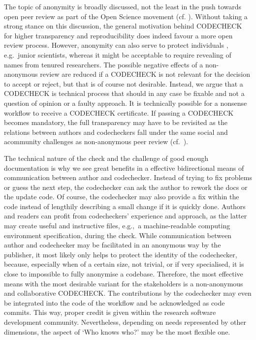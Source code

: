 \documentclass[12pt]{article}
\begin{document}
The topic of anonymity is broadly discussed, not the least in the push towards
open peer review as part of the Open Science movement 
(cf. \cite{ross-hellauer_guidelines_2019}).
Without taking a strong stance on this discussion, the general motivation 
behind CODECHECK
for higher transparency and reproducibility does indeed favour a more open 
review process.
However, anonymity can also serve to protect individuals 
\cite{tennant_limitations_2020}, e.g.~junior scientists, whereas it might 
be acceptable to require revealing of names from tenured researchers.
The possible negative effects of a non-anonymous review are reduced
if a CODECHECK is not relevant for the decision to accept or reject, but that
is of course not desirable. Instead, we argue that a CODECHECK is technical
process that should in any case be fixable and not a question of opinion or
a faulty approach.
It is technically possible for a nonsense workflow to receive
a CODECHECK certificate.
If passing a CODECHECK becomes mandatory, the full transparency may have to be 
revisited as the relations between authors and codecheckers fall under the
same social and acommunity challenges as non-anonymous peer review
(cf.~\cite{everythinghertz123}).

The technical nature of the check and the challenge of good enough 
documentation is why we see great benefits in a effective bidirectional
means of communication between author and codechecker. Instead of trying to
fix problems or guess the next step, the codechecker can ask the author to 
rework the docs  or the update code.
Of course, the codechecker may also provide a fix within the code instead
of lengthily describing a small change if it is quickly done.
Authors and readers can profit from codecheckers' experience and approach,
as the latter may create useful and instructive files, e.g.,~a machine-readable
computing environment specification, during the check.
While communication between author and codechecker may be facilitated in an 
anonymous way by the 
publisher, it most likely only helps to protect the identity of the 
codechecker, because, especially when of a certain size, not trivial, or 
if very specialised, it is close to impossible to fully anonymise a codebase.
Therefore, the most effective means with the most desirable variant for
the stakeholders is a non-anonymous and collaborative CODECHECK.
The contributions by the codechecker may even be integrated into
the code of the workflow and be acknowledged as code commits. This way, 
proper credit is given within the research software development community.
Nevertheless, depending on needs represented by other dimensions,
the aspect of `Who knows who?' may be the most flexible one.
\end{document}

